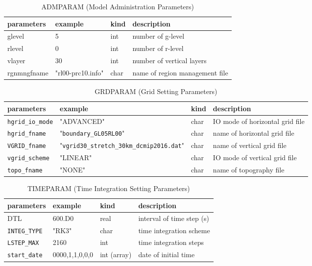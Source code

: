 \documentclass[a4paper]{article}
\begin{document}
\begin{table}[htb]
\begin{center}
\caption{ADMPARAM (Model Administration Parameters)}
\begin{tabularx}{150mm}{|l|l|l|X|} \hline
 \rowcolor[gray]{0.9} parameters & example & kind & description          \\ \hline
 glevel      & 5                 & int  & number of g-level              \\ \hline
 rlevel      & 0                 & int  & number of r-level              \\ \hline
 vlayer      & 30                & int  & number of vertical layers      \\ \hline
 rgnmngfname & "rl00-prc10.info" & char & name of region management file \\ \hline
\end{tabularx}
\end{center}
\end{table}

\begin{table}[htb]
\begin{center}
\caption{GRDPARAM (Grid Setting Parameters)}
\begin{tabularx}{150mm}{|l|l|l|X|} \hline
 \rowcolor[gray]{0.9} parameters & example & kind & description      \\ \hline
 \verb|hgrid_io_mode| & "ADVANCED" & char & IO mode of horizontal grid file \\ \hline
 \verb|hgrid_fname|   & "\verb|boundary_GL05RL00|"                  & char & name of horizontal grid file \\ \hline
 \verb|VGRID_fname|   & "\verb|vgrid30_stretch_30km_dcmip2016.dat|" & char & name of vertical grid file \\ \hline
 \verb|vgrid_scheme|  & "LINEAR"   & char & IO mode of vertical grid file   \\ \hline
 \verb|topo_fname|    & "NONE"     & char & name of topography file         \\ \hline
\end{tabularx}
\end{center}
\end{table}

\begin{table}[htb]
\begin{center}
\caption{TIMEPARAM (Time Integration Setting Parameters)}
\begin{tabularx}{150mm}{|l|l|l|X|} \hline
 \rowcolor[gray]{0.9} parameters & example & kind & description          \\ \hline
 DTL        & 600.D0 & real & interval of time step (s) \\ \hline
 \verb|INTEG_TYPE| & "RK3"  & char & time integration scheme \\ \hline
 \verb|LSTEP_MAX|  & 2160   & int  &  time integration steps \\ \hline
 \verb|start_date| & 0000,1,1,0,0,0 & int (array) & date of initial time \\ \hline
\end{tabularx}
\end{center}
\end{table}
\end{document}

